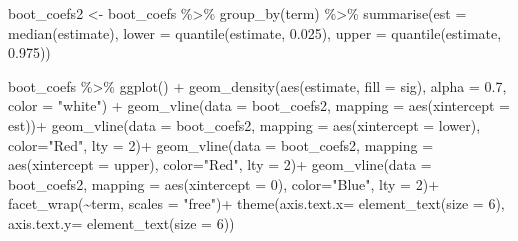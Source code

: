 \documentclass[
]{article}
\newenvironment{Shaded}{\begin{snugshade}}{\end{snugshade}}
\newcommand{\AttributeTok}[1]{\textcolor[rgb]{0.77,0.63,0.00}{#1}}
\newcommand{\DecValTok}[1]{\textcolor[rgb]{0.00,0.00,0.81}{#1}}
\newcommand{\FloatTok}[1]{\textcolor[rgb]{0.00,0.00,0.81}{#1}}
\newcommand{\FunctionTok}[1]{\textcolor[rgb]{0.00,0.00,0.00}{#1}}
\newcommand{\NormalTok}[1]{#1}
\newcommand{\OtherTok}[1]{\textcolor[rgb]{0.56,0.35,0.01}{#1}}
\newcommand{\SpecialCharTok}[1]{\textcolor[rgb]{0.00,0.00,0.00}{#1}}
\newcommand{\StringTok}[1]{\textcolor[rgb]{0.31,0.60,0.02}{#1}}
\begin{document}
\begin{Shaded}
\begin{Highlighting}[]
\NormalTok{boot\_coefs2 }\OtherTok{\textless{}{-}}\NormalTok{ boot\_coefs }\SpecialCharTok{\%\textgreater{}\%}
  \FunctionTok{group\_by}\NormalTok{(term) }\SpecialCharTok{\%\textgreater{}\%}
  \FunctionTok{summarise}\NormalTok{(}\AttributeTok{est =} \FunctionTok{median}\NormalTok{(estimate), }\AttributeTok{lower =} \FunctionTok{quantile}\NormalTok{(estimate, }\FloatTok{0.025}\NormalTok{), }\AttributeTok{upper =} \FunctionTok{quantile}\NormalTok{(estimate, }\FloatTok{0.975}\NormalTok{))}

\NormalTok{boot\_coefs }\SpecialCharTok{\%\textgreater{}\%}
  \FunctionTok{ggplot}\NormalTok{() }\SpecialCharTok{+}
  \FunctionTok{geom\_density}\NormalTok{(}\FunctionTok{aes}\NormalTok{(estimate, }\AttributeTok{fill =}\NormalTok{ sig), }\AttributeTok{alpha =} \FloatTok{0.7}\NormalTok{,  }\AttributeTok{color =} \StringTok{"white"}\NormalTok{) }\SpecialCharTok{+}
  \FunctionTok{geom\_vline}\NormalTok{(}\AttributeTok{data =}\NormalTok{ boot\_coefs2, }\AttributeTok{mapping =} \FunctionTok{aes}\NormalTok{(}\AttributeTok{xintercept =}\NormalTok{ est))}\SpecialCharTok{+}
  \FunctionTok{geom\_vline}\NormalTok{(}\AttributeTok{data =}\NormalTok{ boot\_coefs2, }\AttributeTok{mapping =} \FunctionTok{aes}\NormalTok{(}\AttributeTok{xintercept =}\NormalTok{ lower), }\AttributeTok{color=}\StringTok{"Red"}\NormalTok{, }\AttributeTok{lty =} \DecValTok{2}\NormalTok{)}\SpecialCharTok{+}
  \FunctionTok{geom\_vline}\NormalTok{(}\AttributeTok{data =}\NormalTok{ boot\_coefs2, }\AttributeTok{mapping =} \FunctionTok{aes}\NormalTok{(}\AttributeTok{xintercept =}\NormalTok{ upper), }\AttributeTok{color=}\StringTok{"Red"}\NormalTok{, }\AttributeTok{lty =} \DecValTok{2}\NormalTok{)}\SpecialCharTok{+}
  \FunctionTok{geom\_vline}\NormalTok{(}\AttributeTok{data =}\NormalTok{ boot\_coefs2, }\AttributeTok{mapping =} \FunctionTok{aes}\NormalTok{(}\AttributeTok{xintercept =} \DecValTok{0}\NormalTok{), }\AttributeTok{color=}\StringTok{"Blue"}\NormalTok{, }\AttributeTok{lty =} \DecValTok{2}\NormalTok{)}\SpecialCharTok{+}
  \FunctionTok{facet\_wrap}\NormalTok{(}\SpecialCharTok{\textasciitilde{}}\NormalTok{term, }\AttributeTok{scales =} \StringTok{"free"}\NormalTok{)}\SpecialCharTok{+}
  \FunctionTok{theme}\NormalTok{(}\AttributeTok{axis.text.x=} \FunctionTok{element\_text}\NormalTok{(}\AttributeTok{size =} \DecValTok{6}\NormalTok{),}
        \AttributeTok{axis.text.y=} \FunctionTok{element\_text}\NormalTok{(}\AttributeTok{size =} \DecValTok{6}\NormalTok{))}
\end{Highlighting}
\end{Shaded}
\end{document}
